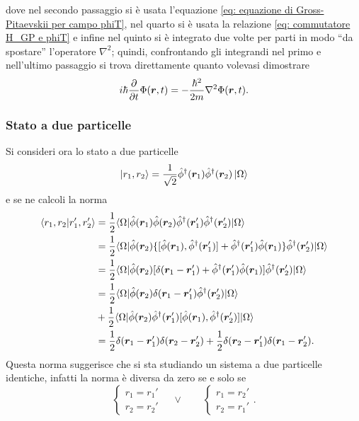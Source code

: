 dove nel secondo passaggio si è usata l'equazione \eqref{eq: equazione di Gross-Pitaevskii per campo phiT}, nel quarto si è usata la relazione \eqref{eq: commutatore H_GP e phiT} e infine nel quinto si è integrato due volte per parti in modo ``da spostare'' l'operatore $\nabla^2$; quindi, confrontando gli integrandi nel primo e nell'ultimo passaggio si trova direttamente quanto volevasi dimostrare
\begin{equation}
    i\hbar\frac{\partial}{\partial t}\Phi(\bm{r},t) = -\frac{\hbar^2}{2m}\nabla^2\Phi(\bm{r},t).
\end{equation}

\subsubsection{Stato a due particelle}
Si consideri ora lo stato a due particelle 
\begin{equation}
    \ket{r_1,r_2} = \frac{1}{\sqrt{2}}\hat{\phi}^\dagger(\bm{r}_1)\hat{\phi}^\dagger(\bm{r}_2)\ket{\Omega}
\end{equation}
e se ne calcoli la norma 
\begin{equation}
    \begin{split}
        \langle r_1,r_2 | r_1',r_2' \rangle &= \frac{1}{2}\langle \Omega | \hat{\phi}(\bm{r}_1)\hat{\phi}(\bm{r}_2)\hat{\phi}^\dagger(\bm{r}_1')\hat{\phi}^\dagger(\bm{r}_2') | \Omega \rangle \\
        &= \frac{1}{2}\langle \Omega | \hat{\phi}(\bm{r}_2)\{[\hat{\phi}(\bm{r}_1),\hat{\phi}^\dagger(\bm{r}_1')] + \hat{\phi}^\dagger(\bm{r}_1')\hat{\phi}(\bm{r}_1)\}\hat{\phi}^\dagger(\bm{r}_2') | \Omega \rangle \\
        &= \frac{1}{2}\langle \Omega | \hat{\phi}(\bm{r}_2)[\delta(\bm{r}_1 - \bm{r}_1') + \hat{\phi}^\dagger(\bm{r}_1')\hat{\phi}(\bm{r}_1)]\hat{\phi}^\dagger(\bm{r}_2') | \Omega \rangle \\
        &= \frac{1}{2}\langle \Omega | \hat{\phi}(\bm{r}_2)\delta(\bm{r}_1 - \bm{r}_1')\hat{\phi}^\dagger(\bm{r}_2') | \Omega \rangle \\
        &+ \frac{1}{2}\langle \Omega | \hat{\phi}(\bm{r}_2)\hat{\phi}^\dagger(\bm{r}_1')[\hat{\phi}(\bm{r}_1),\hat{\phi}^\dagger(\bm{r}_2')] | \Omega \rangle \\
        &= \frac{1}{2}\delta(\bm{r}_1 - \bm{r}_1')\delta(\bm{r}_2 - \bm{r}_2') + \frac{1}{2}\delta(\bm{r}_2 - \bm{r}_1')\delta(\bm{r}_1 - \bm{r}_2').
    \end{split}
\end{equation}
Questa norma suggerisce che si sta studiando un sistema a due particelle identiche, infatti la norma è diversa da zero se e solo se
\begin{equation}
    \begin{cases}
        r_1 = r_1' \\
        r_2 = r_2'
    \end{cases}
    \quad \vee \quad\quad
    \begin{cases}
        r_1 = r_2' \\
        r_2 = r_1'
    \end{cases}.
\end{equation}
